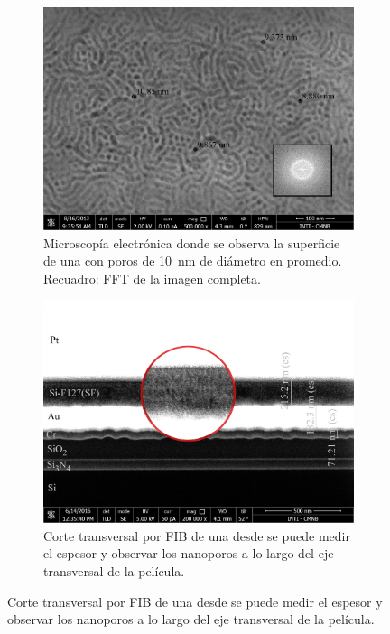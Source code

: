 				\begin{figure}[bh!]
		 	   	    \begin{subfigure}[t]{0.495\textwidth}
			        	\includegraphics[width=\textwidth]{Imagenes/Superficie-F127-medidas.jpg}
			       		\caption{Microscopía electrónica donde se observa la superficie de una \pdmF\space con poros de \SI{10}{nm} de diámetro en promedio. Recuadro: FFT de la imagen completa.}
			       		\label{fig:sem_homogeneidad1}
			       		\end{subfigure}
			       	\begin{subfigure}[t]{0.495\textwidth}
			 	   	    \includegraphics[width=\textwidth]{Imagenes/Perfil-F127.jpg}
			       		\caption{Corte transversal por FIB de una \pdmF\space desde se puede medir el espesor y observar los nanoporos a lo largo del eje transversal de la película.}

\end{subfigure}
\end{figure}
